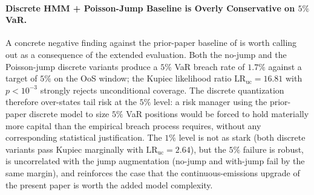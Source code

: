 \paragraph{Discrete HMM + Poisson-Jump Baseline is Overly Conservative on $5\%$ VaR.}
A concrete negative finding against the prior-paper baseline of \citet{alswaidan2026hybrid} is worth calling out as a consequence of the extended evaluation.
Both the no-jump and the Poisson-jump discrete variants produce a $5\%$ VaR breach rate of $1.7\%$ against a target of $5\%$ on the OoS window; the Kupiec likelihood ratio $\text{LR}_{\text{uc}} = 16.81$ with $p < 10^{-3}$ strongly rejects unconditional coverage.
The discrete quantization therefore over-states tail risk at the $5\%$ level: a risk manager using the prior-paper discrete model to size $5\%$ VaR positions would be forced to hold materially more capital than the empirical breach process requires, without any corresponding statistical justification.
The $1\%$ level is not as stark (both discrete variants pass Kupiec marginally with $\text{LR}_{\text{uc}} = 2.64$), but the $5\%$ failure is robust, is uncorrelated with the jump augmentation (no-jump and with-jump fail by the same margin), and reinforces the case that the continuous-emissions upgrade of the present paper is worth the added model complexity.

